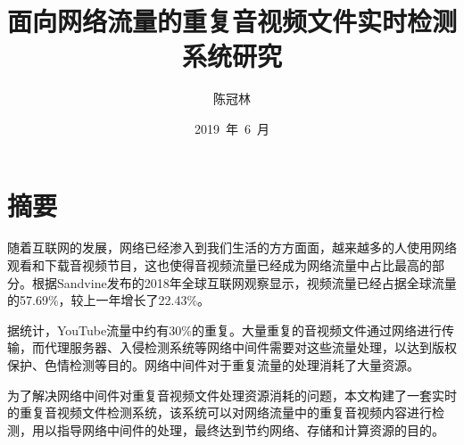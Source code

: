 \confidential{}%
\title{面向网络流量的重复音视频文件实时检测系统研究}%
\author{陈冠林}%
\date{2019~年~6~月}%
\maketitle%
\MAKETITLE%
\makedeclaration%
\chapter*{摘\quad 要}%
\setcounter{page}{1}%

随着互联网的发展，网络已经渗入到我们生活的方方面面，越来越多的人使用网络观看和下载音视频节目，这也使得音视频流量已经成为网络流量中占比最高的部分。根据Sandvine发布的2018年全球互联网观察显示，视频流量已经占据全球流量的57.69\%，较上一年增长了22.43\%。

据统计，YouTube流量中约有30\%的重复。大量重复的音视频文件通过网络进行传输，而代理服务器、入侵检测系统等网络中间件需要对这些流量处理，以达到版权保护、色情检测等目的。网络中间件对于重复流量的处理消耗了大量资源。

为了解决网络中间件对重复音视频文件处理资源消耗的问题，本文构建了一套实时的重复音视频文件检测系统，该系统可以对网络流量中的重复音视频内容进行检测，用以指导网络中间件的处理，最终达到节约网络、存储和计算资源的目的。

